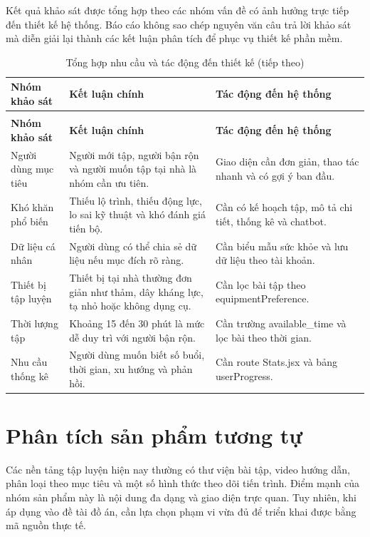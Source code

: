 Kết quả khảo sát được tổng hợp theo các nhóm vấn đề có ảnh hưởng trực tiếp đến thiết kế hệ thống. Báo cáo không sao chép nguyên văn câu trả lời khảo sát mà diễn giải lại thành các kết luận phân tích để phục vụ thiết kế phần mềm.


\begingroup
\setlength{\tabcolsep}{3pt}
\renewcommand{\arraystretch}{1.25}
\begin{longtable}{|P{0.220\textwidth}|P{0.330\textwidth}|P{0.370\textwidth}|}
\caption{Tổng hợp nhu cầu và tác động đến thiết kế}\\
\hline
\textbf{Nhóm khảo sát} & \textbf{Kết luận chính} & \textbf{Tác động đến hệ thống} \\
\hline
\endfirsthead
\caption[]{Tổng hợp nhu cầu và tác động đến thiết kế (tiếp theo)}\\
\hline
\textbf{Nhóm khảo sát} & \textbf{Kết luận chính} & \textbf{Tác động đến hệ thống} \\
\hline
\endhead
Người dùng mục tiêu & Người mới tập, người bận rộn và người muốn tập tại nhà là nhóm cần ưu tiên. & Giao diện cần đơn giản, thao tác nhanh và có gợi ý ban đầu. \\
\hline
Khó khăn phổ biến & Thiếu lộ trình, thiếu động lực, lo sai kỹ thuật và khó đánh giá tiến bộ. & Cần có kế hoạch tập, mô tả chi tiết, thống kê và chatbot. \\
\hline
Dữ liệu cá nhân & Người dùng có thể chia sẻ dữ liệu nếu mục đích rõ ràng. & Cần biểu mẫu sức khỏe và lưu dữ liệu theo tài khoản. \\
\hline
Thiết bị tập luyện & Thiết bị tại nhà thường đơn giản như thảm, dây kháng lực, tạ nhỏ hoặc không dụng cụ. & Cần lọc bài tập theo equipmentPreference. \\
\hline
Thời lượng tập & Khoảng 15 đến 30 phút là mức dễ duy trì với người bận rộn. & Cần trường available\_time và lọc bài theo thời gian. \\
\hline
Nhu cầu thống kê & Người dùng muốn biết số buổi, thời gian, xu hướng và phản hồi. & Cần route Stats.jsx và bảng userProgress. \\
\hline
\end{longtable}
\endgroup

\section{Phân tích sản phẩm tương tự}

Các nền tảng tập luyện hiện nay thường có thư viện bài tập, video hướng dẫn, phân loại theo mục tiêu và một số hình thức theo dõi tiến trình. Điểm mạnh của nhóm sản phẩm này là nội dung đa dạng và giao diện trực quan. Tuy nhiên, khi áp dụng vào đề tài đồ án, cần lựa chọn phạm vi vừa đủ để triển khai được bằng mã nguồn thực tế.


